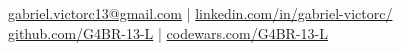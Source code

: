 
\begin{center}

  \href{mailto:gabriel.victorc13@gmail.com}{gabriel.victorc13@gmail.com} |
  \href{https://linkedin.com/in/gabriel-victorc/}{linkedin.com/in/gabriel-victorc/}
  \href{https://github.com/G4BR-13-L}{github.com/G4BR-13-L} |
  \href{https://www.codewars.com/users/G4BR-%3E13-L}{codewars.com/G4BR-13-L}
\end{center}